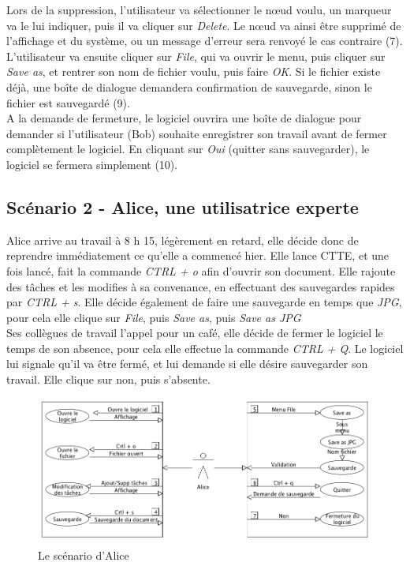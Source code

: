 \documentclass[12pt, a4paper]{article}
\begin{document}
Lors de la suppression, l'utilisateur va sélectionner le nœud voulu, un marqueur va le lui indiquer, puis il va cliquer sur \emph{Delete}. Le nœud va ainsi être supprimé de l'affichage et du système, ou un message d'erreur sera renvoyé le cas contraire (7).\\ 


L'utilisateur va ensuite cliquer sur \emph{File}, qui va ouvrir le menu, puis cliquer sur \emph{Save as}, et rentrer son nom de fichier voulu, puis faire \emph{OK}. Si le fichier existe déjà, une boîte de dialogue demandera confirmation de sauvegarde, sinon le fichier est sauvegardé (9).\\ 


A la demande de fermeture, le logiciel ouvrira une boîte de dialogue pour demander si l'utilisateur (Bob) souhaite enregistrer son travail avant de fermer complètement le logiciel. En cliquant sur \emph{Oui} (quitter sans sauvegarder), le logiciel se fermera simplement (10). \\ \newpage
\subsection{Scénario 2 - Alice, une utilisatrice experte}


Alice arrive au travail à 8 h 15, légèrement en retard, elle décide donc de reprendre immédiatement ce qu'elle a commencé hier. Elle lance CTTE, et une fois lancé, fait la commande \emph{CTRL + o} afin d'ouvrir son document. Elle rajoute des tâches et les modifies à sa convenance, en effectuant des sauvegardes rapides par \emph{CTRL + s}. Elle décide également de faire une sauvegarde en temps que \emph{JPG}, pour cela elle clique sur \emph{File}, puis \emph{Save as}, puis \emph{Save as JPG} \\


Ses collègues de travail l'appel pour un café, elle décide de fermer le logiciel le temps de son absence, pour cela elle effectue la commande \emph{CTRL + Q}. Le logiciel lui signale qu'il va être fermé, et lui demande si elle désire sauvegarder son travail. Elle clique sur non, puis s'absente.\\

\begin{figure}[h]
\begin{center}
   \includegraphics[scale = 0.4]{scenario-alice.png}
	\caption{Le scénario d'Alice}
	\end{center}
\end{figure}
\end{document}
